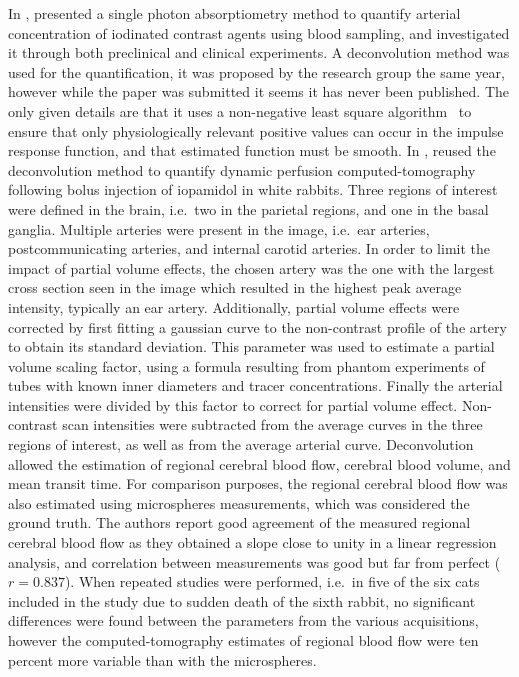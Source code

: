 In \citeyear{Yeung:1992df}, \citet{Yeung:1992df} presented a single photon absorptiometry method to quantify arterial concentration of iodinated contrast agents using blood sampling, and investigated it through both preclinical and clinical experiments.
A deconvolution method was used for the quantification, it was proposed by the research group the same year, however while the paper was submitted it seems it has never been published.
The only given details are that it uses a non-negative least square algorithm~\cite{Lawson:1995wg} to ensure that only physiologically relevant positive values can occur in the impulse response function, and that estimated function must be smooth.
In \citeyear{Cenic:1999un}, \citet{Cenic:1999un} reused the deconvolution method to quantify dynamic perfusion computed-tomography following bolus injection of iopamidol in white rabbits.
Three regions of interest were defined in the brain, i.e.~two in the parietal regions, and one in the basal ganglia.
Multiple arteries were present in the image, i.e.~ear arteries, postcommunicating arteries, and internal carotid arteries.
In order to limit the impact of partial volume effects, the chosen artery was the one with the largest cross section seen in the image which resulted in the highest peak average intensity, typically an ear artery.
Additionally, partial volume effects were corrected by first fitting a gaussian curve to the non-contrast profile of the artery to obtain its standard deviation.
This parameter was used to estimate a partial volume scaling factor, using a formula resulting from phantom experiments of tubes with known inner diameters and tracer concentrations.
Finally the arterial intensities were divided by this factor to correct for partial volume effect.
Non-contrast scan intensities were subtracted from the average curves in the three regions of interest, as well as from the average arterial curve. 
Deconvolution allowed the estimation of regional cerebral blood flow, cerebral blood volume, and mean transit time.
For comparison purposes, the regional cerebral blood flow was also estimated using microspheres measurements, which was considered the ground truth.
The authors report good agreement of the measured regional cerebral blood flow as they obtained a slope close to unity in a linear regression analysis, and correlation between measurements was good but far from perfect ($r = 0.837$).
When repeated studies were performed, i.e.~in five of the six cats included in the study due to sudden death of the sixth rabbit, no significant differences were found between the parameters from the various acquisitions, however the computed-tomography estimates of regional blood flow were ten percent more variable than with the microspheres.

